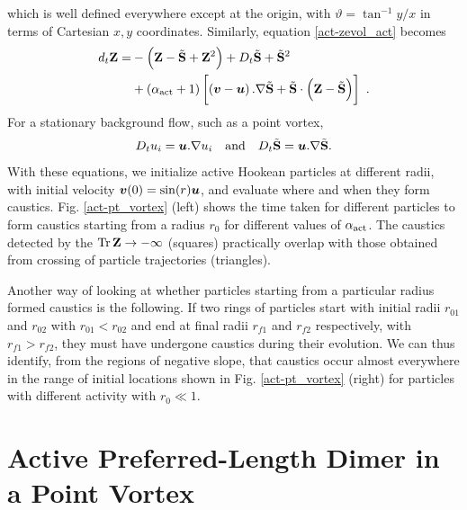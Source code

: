 \documentclass[../Rajarshi-thesis-draft.tex]{subfiles}
\begin{document}
which is well defined everywhere except at the origin, with $\vartheta = \tan^{-1}y/x$ in terms of Cartesian $x,y$ coordinates.
Similarly, equation \eqref{act-zevol_act} becomes
    \begin{align}
    \label{act-nd_ZEvol}
    d_t\mathbf{Z} = & -\left( \mathbf{Z} - \tilde{\mathbf{S}} +\mathbf{Z}^2 \right)+   D_t \tilde{\mathbf{S}} +\tilde{\mathbf{S}}^2 \nonumber \\
    & + \left( \alpha_{\rm act} + 1 \right)\left[ \left( \boldsymbol{v} -\boldsymbol{u} \right).\nabla\tilde{\mathbf{S}} + \tilde{\mathbf{S}}\cdot\left( \mathbf{Z} - \tilde{\mathbf{S}}\right) \right] \ .
    \end{align}
    For a stationary background flow, such as a point vortex,
 \begin{align}
        \begin{split}
        D_tu_i = \boldsymbol{u}.\nabla u_i\quad {\rm and} \quad D_t\tilde{\mathbf{S}} = \boldsymbol{u}.\nabla \tilde{\mathbf{S}}.
    \end{split}
\end{align}
With these equations, we initialize active Hookean particles at different radii, with initial velocity $\boldsymbol{v}(0) = \sin(r) \boldsymbol{u}$, and evaluate where and when they form caustics. Fig. \ref{act-pt_vortex} (left) shows the time taken for different particles to form caustics starting from a radius $r_0$ for different values of $\alpha_{\rm act}$. The caustics detected by the $\operatorname{Tr}{\mathbf{Z}} \to -\infty$ (squares) practically overlap with those obtained from crossing of particle trajectories (triangles).

Another way of looking at whether particles starting from a particular radius formed caustics is the following. If two rings of particles start with initial radii $r_{01}$ and $r_{02}$ with $r_{01}< r_{02}$ and end at final radii $r_{f1}$ and $r_{f2}$ respectively, with $r_{f1}>r_{f2}$, they must have undergone caustics during their evolution. We can thus identify, from the regions of negative slope, that caustics occur almost everywhere in the range of initial locations shown in Fig. \ref{act-pt_vortex} (right) for particles with different activity with $r_0 \ll 1$.

\section{Active Preferred-Length Dimer in a Point Vortex}
    
\end{document}
